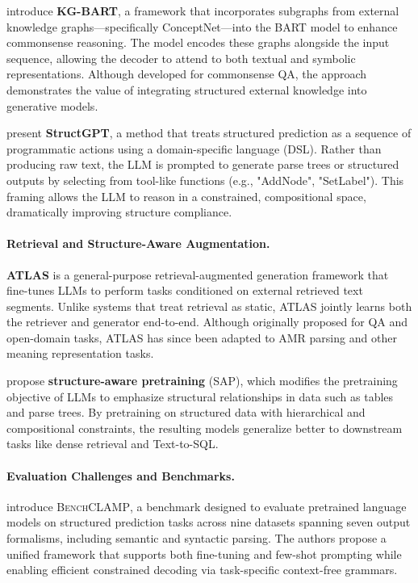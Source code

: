 \citet{liu2021kgbart} introduce \textbf{KG-BART}, a framework that incorporates subgraphs from external knowledge graphs—specifically ConceptNet—into the BART model to enhance commonsense reasoning. The model encodes these graphs alongside the input sequence, allowing the decoder to attend to both textual and symbolic representations. Although developed for commonsense QA, the approach demonstrates the value of integrating structured external knowledge into generative models.

\citet{lu2023structgpt} present \textbf{StructGPT}, a method that treats structured prediction as a sequence of programmatic actions using a domain-specific language (DSL). Rather than producing raw text, the LLM is prompted to generate parse trees or structured outputs by selecting from tool-like functions (e.g., "AddNode", "SetLabel"). This framing allows the LLM to reason in a constrained, compositional space, dramatically improving structure compliance.

\paragraph{Retrieval and Structure-Aware Augmentation.} \textbf{ATLAS} \citep{izacard2024atlas} is a general-purpose retrieval-augmented generation framework that fine-tunes LLMs to perform tasks conditioned on external retrieved text segments. Unlike systems that treat retrieval as static, ATLAS jointly learns both the retriever and generator end-to-end. Although originally proposed for QA and open-domain tasks, ATLAS has since been adapted to AMR parsing and other meaning representation tasks.

\citet{li2023structure} propose \textbf{structure-aware pretraining} (SAP), which modifies the pretraining objective of LLMs to emphasize structural relationships in data such as tables and parse trees. By pretraining on structured data with hierarchical and compositional constraints, the resulting models generalize better to downstream tasks like dense retrieval and Text-to-SQL.

\paragraph{Evaluation Challenges and Benchmarks.} \citet{bharadwaj2023benchclamp} introduce \textsc{BenchCLAMP}, a benchmark designed to evaluate pretrained language models on structured prediction tasks across nine datasets spanning seven output formalisms, including semantic and syntactic parsing. The authors propose a unified framework that supports both fine-tuning and few-shot prompting while enabling efficient constrained decoding via task-specific context-free grammars.

